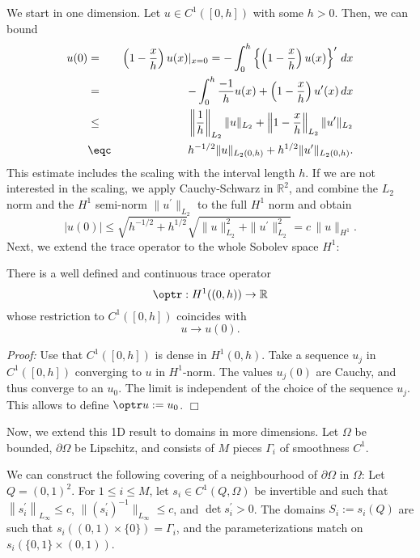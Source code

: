 We start in one dimension. Let $u \in C^1 ([0,h])$ with some $h > 0$. Then,
we can bound 
\begin{eqnarray*}
u(0) & = & \left(1 - \frac{x}{h} \right) u(x) |_{x=0} = 
        - \int_0^h \left\{ \left(1-\frac{x}{h} \right) u(x) \right\}^\prime \, dx \\
        & = & -\int_0^h  \frac{-1}{h} u(x) + \left(1-\frac{x}{h} \right) u^\prime(x)  \, dx \\
        & \leq & \left\| \frac{1}{h} \right\|_{L_2} \| u \|_{L_2} + 
                \left\| 1-\frac{x}{h} \right\|_{L_2} \| u^\prime \|_{L_2} \\
        & \eqc & h^{-1/2} \| u \|_{L_2(0,h)} + h^{1/2} \| u^\prime \|_{L_2(0,h)}.
\end{eqnarray*}
This estimate includes the scaling with the interval length $h$. 
If we are not interested in the scaling, we apply Cauchy-Schwarz in ${\mathbb R}^2$,
and combine the $L_2$ norm and the $H^1$ semi-norm $\|u^\prime\|_{L_2}$ to the full $H^1$ norm and obtain
$$
|u(0)| \leq \sqrt{h^{-1/2} + h^{1/2} } \sqrt{ \| u \|_{L_2}^2 + \| u^\prime \|_{L_2}^2 } = c \, \| u \|_{H^1}.
$$
Next, we extend the trace operator to the whole Sobolev space $H^1$:
\begin{theorem} There is a well defined and continuous trace operator
$$
\optr : H^1((0,h)) \rightarrow {\mathbb R}
$$
whose restriction to $C^1([0,h])$ coincides with
$$
u \rightarrow u(0).
$$
\end{theorem}
{\em Proof:} Use that $C^1([0,h])$ is dense in $H^1(0,h)$. Take a sequence
$u_j$ in $C^1([0,h])$ converging to $u$ in $H^1$-norm. The values 
$u_j(0)$ are Cauchy, and thus converge to an $u_0$. The limit is independent 
of the choice of the sequence $u_j$. This allows to define $\optr u := u_0$.
\hfill $\Box$

\medskip

Now, we extend this 1D result to domains in more dimensions. Let
$\Omega$ be bounded, $\partial \Omega$ be Lipschitz, and consists of
$M$ pieces $\Gamma_i$ of smoothness $C^1$. 

We can construct the following covering of a neighbourhood of 
$\partial \Omega$ in $\Omega$: Let $Q = (0,1)^2$. For $1 \leq i \leq M$, 
let $s_i \in C^1 (Q, \Omega)$ be invertible and such that $\left\| s_i^\prime \right\|_{L_\infty} \leq c$,
 $\| (s_i^\prime)^{-1} \|_{L_\infty} \leq c$, and $\operatorname{det} s_i^\prime > 0$. The domains $S_i := s_i(Q)$ are
such that $s_i( (0,1) \times \{ 0 \} ) = \Gamma_i$, and the parameterizations
match on $s_i( \{ 0,1 \} \times (0,1) )$.

